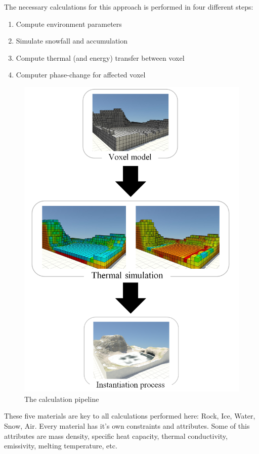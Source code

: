 The necessary calculations for this approach is performed in four different steps:
\begin{enumerate}
	\item Compute environment parameters
	\item Simulate snowfall and accumulation
	\item Compute thermal (and energy) transfer between voxel
	\item Computer phase-change for affected voxel
\end{enumerate}

\begin{figure}[htb]
	\centering
	\includegraphics[width=\linewidth]{BF01/sem_heat2_merged.png}
	\caption{The calculation pipeline}
	\label{fig:calcpipeline}
\end{figure}

These five materials are key to all calculations performed here: Rock, Ice, Water, Snow, Air. Every material has it's own constraints and attributes. Some of this attributes are mass density, specific heat capacity, thermal conductivity, emissivity, melting temperature, etc.

